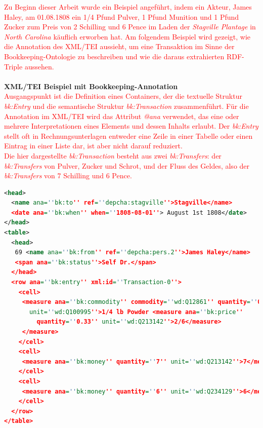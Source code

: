 \documentclass[12pt,a4paper]{article}
\begin{document}
\textcolor{red}{
Zu Beginn dieser Arbeit wurde ein Beispiel angeführt, indem ein Akteur, James Haley, am 01.08.1808 ein 1/4 Pfund Pulver, 1 Pfund Munition und 1 Pfund Zucker zum Preis von 2 Schilling und 6 Pence im Laden der \textit{Stagville Plantage} in \textit{North Carolina} käuflich erworben hat. Am folgendem Beispiel wird gezeigt, wie die Annotation des XML/TEI aussieht, um eine Transaktion im Sinne der Bookkeeping-Ontologie zu beschreiben und wie die daraus extrahierten RDF-Triple aussehen.}
\\
\\
\textbf{XML/TEI Beispiel mit Bookkeeping-Annotation}
\\
\textcolor{red}{
Ausgangspunkt ist die Definition eines Containers, der die textuelle Struktur \textit{bk:Entry} und die semantische Struktur \textit{bk:Transaction} zusammenführt. Für die Annotation im XML/TEI wird das Attribut \textit{@ana} verwendet, das eine oder mehrere Interpretationen eines Elements und dessen Inhalts erlaubt. Der \textit{bk:Entry} stellt oft in Rechnungsunterlagen entweder eine Zeile in einer Tabelle oder einen Eintrag in einer Liste dar, ist aber nicht darauf reduziert.
\\
Die hier dargestellte \textit{bk:Transaction} besteht aus zwei \textit{bk:Transfers}: der \textit{bk:Transfers} von Pulver, Zucker und Schrot, und der Fluss des Geldes, also der \textit{bk:Transfers} von 7 Schilling und 6 Pence.
}
\newpage
\begin{lstlisting}[language=XML]
<head> 
  <name ana=''bk:to'' ref=''depcha:stagville''>Stagville</name> 
  <date ana=''bk:when'' when=''1808-08-01''> August 1st 1808</date>
</head> 
<table>
  <head>
   69 <name ana=''bk:from'' ref=''depcha:pers.2''>James Haley</name> 
   <span ana=''bk:status''>Self Dr.</span> 
  </head> 
  <row ana=''bk:entry'' xml:id=''Transaction-0''> 
    <cell> 
     <measure ana=''bk:commodity'' commodity=''wd:Q12861'' quantity=''0.25'' 
       unit=''wd:Q100995''>1/4 lb Powder <measure ana=''bk:price'' 
         quantity=''0.33'' unit=''wd:Q213142''>2/6</measure>
     </measure>
    </cell> 
    <cell> 
     <measure ana=''bk:money'' quantity=''7'' unit=''wd:Q213142''>7</measure>
    </cell>
    <cell> 
     <measure ana=''bk:money'' quantity=''6'' unit=''wd:Q234129''>6</measure>
    </cell>
  </row>
</table>
\end{lstlisting}
\end{document}
